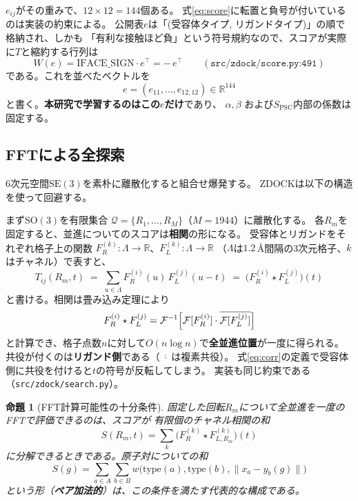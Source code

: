 \documentclass[11pt,a4paper]{article}
\newcommand{\R}{\mathbb{R}}
\newcommand{\SOthree}{\mathrm{SO}(3)}
\newtheorem{prop}{命題}
\begin{document}
$e_{ij}$がその重みで、$12\times12 = 144$個ある。
式\eqref{eq:score}に転置と負号が付いているのは実装の約束による。
公開表$e$は「(受容体タイプ, リガンドタイプ)」の順で格納され、しかも
「有利な接触ほど負」という符号規約なので、スコアが実際に$T$と縮約する行列は
\begin{equation}
  W(e) = \mathrm{IFACE\_SIGN}\cdot e^{\top} = -\,e^{\top}
  \qquad (\texttt{src/zdock/score.py:491})
\end{equation}
である。これを並べたベクトルを
\begin{equation}
  e = (e_{11},\dots,e_{12,12}) \in \R^{144}
\end{equation}
と書く。\textbf{本研究で学習するのはこの$e$だけ}であり、
$\alpha, \beta$ および$S_{\mathrm{PSC}}$内部の係数は固定する。

\subsection{FFTによる全探索}

$6$次元空間$\mathrm{SE}(3)$を素朴に離散化すると組合せ爆発する。
ZDOCKは以下の構造を使って回避する。

まず$\SOthree$を有限集合
$\mathcal{Q} = \{R_1,\dots,R_M\}$（$M = 1944$）に離散化する。
各$R_m$を固定すると、並進についてのスコアは\textbf{相関}の形になる。
受容体とリガンドをそれぞれ格子上の関数
$F^{(k)}_R : \Lambda \to \R$、$F^{(k)}_L : \Lambda \to \R$
（$\Lambda$は$1.2$\,\AA{}間隔の3次元格子、$k$はチャネル）で表すと、
\begin{equation}
  T_{ij}(R_m, t) \;=\; \sum_{u \in \Lambda} F^{(i)}_R(u)\, F^{(j)}_L(u - t)
  \;=\; \bigl(F^{(i)}_R \star F^{(j)}_L\bigr)(t)
  \label{eq:corr}
\end{equation}
と書ける。相関は畳み込み定理により
\begin{equation}
  F^{(i)}_R \star F^{(j)}_L
  = \mathcal{F}^{-1}\Bigl[\mathcal{F}[F^{(i)}_R] \cdot \overline{\mathcal{F}[F^{(j)}_L]}\Bigr]
  \label{eq:fft}
\end{equation}
と計算でき、格子点数$n$に対して$O(n\log n)$で\textbf{全並進位置}が一度に得られる。
共役が付くのは\textbf{リガンド側}である（$\overline{\;\cdot\;}$は複素共役）。
式\eqref{eq:corr}の定義で受容体側に共役を付けると$t$の符号が反転してしまう。
実装も同じ約束である（\texttt{src/zdock/search.py}）。

\begin{prop}[FFT計算可能性の十分条件]
固定した回転$R_m$について全並進を一度のFFTで評価できるのは、スコアが
\emph{有限個のチャネル相関の和}
\begin{equation}
  S(R_m, t) = \sum_{k} \bigl(F^{(k)}_R \star F^{(k)}_{L,R_m}\bigr)(t)
\end{equation}
に分解できるときである。原子対についての和
\begin{equation}
  S(g) = \sum_{a \in A}\sum_{b \in B} w\bigl(\mathrm{type}(a), \mathrm{type}(b), \|x_a - y_b(g)\|\bigr)
\end{equation}
という形（\textbf{ペア加法的}）は、この条件を満たす代表的な構成である。
\end{prop}
\end{document}
